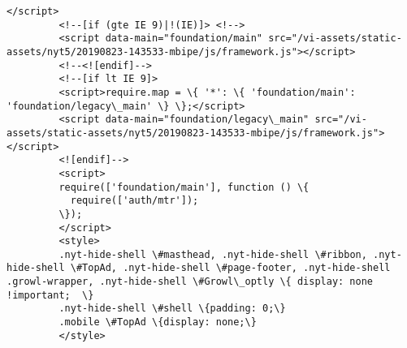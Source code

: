 \documentclass[11pt]{article}
\begin{document}
\begin{Verbatim}[commandchars=\\\{\}]
         </script>
         <!--[if (gte IE 9)|!(IE)]> <!-->
         <script data-main="foundation/main" src="/vi-assets/static-assets/nyt5/20190823-143533-mbipe/js/framework.js"></script>
         <!--<![endif]-->
         <!--[if lt IE 9]>
         <script>require.map = \{ '*': \{ 'foundation/main': 'foundation/legacy\_main' \} \};</script>
         <script data-main="foundation/legacy\_main" src="/vi-assets/static-assets/nyt5/20190823-143533-mbipe/js/framework.js"></script>
         <![endif]-->
         <script>
         require(['foundation/main'], function () \{
           require(['auth/mtr']);
         \});
         </script>
         <style>
         .nyt-hide-shell \#masthead, .nyt-hide-shell \#ribbon, .nyt-hide-shell \#TopAd, .nyt-hide-shell \#page-footer, .nyt-hide-shell .growl-wrapper, .nyt-hide-shell \#Growl\_optly \{ display: none !important;  \}
         .nyt-hide-shell \#shell \{padding: 0;\}
         .mobile \#TopAd \{display: none;\}
         </style>

\end{Verbatim}
\end{document}
